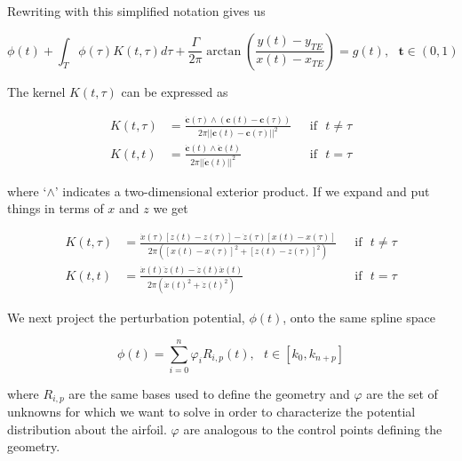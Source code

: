 \noindent Rewriting with this simplified notation gives us

\begin{equation}
\label{eqn:discreteformulation}
\phi(t) + \int_{T} \phi(\tau) K(t,\tau) d\tau + \frac{\Gamma}{2\pi} \arctan\left( \frac{y(t) - y_{TE}}{x(t)-x_{TE}} \right) = g(t), ~~~\mathbf{t} \in (0,1)
\end{equation}

\noindent The kernel $K(t,\tau)$ can be expressed as

\begin{equation}
\begin{aligned}
K(t,\tau) &= \frac{ \dot{\mathbf{c}}(\tau) \wedge \left( \mathbf{c}(t) - \mathbf{c}(\tau) \right) }{2\pi||\mathbf{c}(t)-\mathbf{c}(\tau)||^2} &~~~\mathrm{if}~~~ t\neq\tau\\
K(t,t) &= \frac{\dot{\mathbf{c}}(t)\wedge\ddot{\mathbf{c}}(t) }{2\pi||\dot{\mathbf{c}}(t)||^2} &~~~\mathrm{if}~~~  t=\tau
\end{aligned}
\end{equation}

\noindent where `$\wedge$' indicates a two-dimensional exterior product. If we expand and put things in terms of $x$ and $z$ we get

\begin{equation}
\begin{aligned}
K(t,\tau) &= \frac{ \dot{x}(\tau) \left[ z(t) - z(\tau) \right] - \dot{z}(\tau) \left[ x(t) - x(\tau) \right] }{2\pi\left( \left[ x(t) - x(\tau) \right]^2 + \left[ z(t) - z(\tau) \right]^2 \right)}  &~~~\mathrm{if}~~~ t\neq\tau\\
K(t,t) &= \frac{ \dot{x}(t)\ddot{z}(t) - \dot{z}(t)\ddot{x}(t) }{2\pi\left( \dot{x}(t)^2  + \dot{z}(t)^2 \right)} &~~~\mathrm{if}~~~  t=\tau
\end{aligned}
\end{equation}

We next project the perturbation potential, \( \phi(t) \), onto the same spline space 

\begin{equation}
\label{eqn:projection}
\phi(t) = \sum_{i=0}^{n}\varphi_i R_{i,p}(t),~~~t \in [k_0,k_{n+p}]
\end{equation}

\noindent where \(R_{i,p}\) are the same bases used to define the geometry and \(\varphi\) are the set of unknowns for which we want to solve in order to characterize the potential distribution about the airfoil. $\varphi$ are analogous to the control points defining the geometry. 

